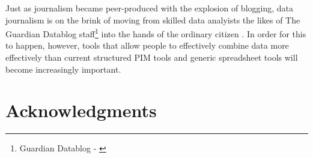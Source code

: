 \documentclass{sigchi}
\begin{document}
Just as journalism became peer-produced with the explosion of blogging, data journalism is on the brink of moving from skilled data analyists the likes of The Guardian Datablog staff\footnote{Guardian Datablog - \url{}} into the hands of the ordinary citizen \cite{datajournalismhandbook}.  In order for this to happen, however, tools that allow people to effectively combine data more effectively than current structured PIM tools and generic spreadsheet tools will become increasingly important. 

\section{Acknowledgments}


%
%
%
%
%
\balance



\end{document}
